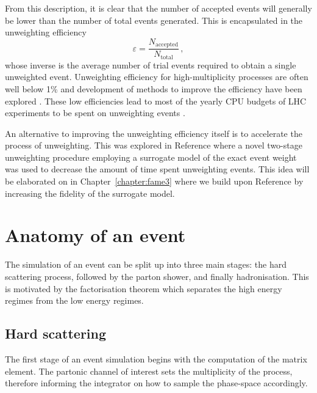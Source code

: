\documentclass[main.tex]{subfiles}
\begin{document}
    From this description, it is clear that the number
    of accepted events will generally be lower than
    the number of total events generated. This is encapsulated
    in the unweighting efficiency
    \begin{equation}\label{eqn:unweighting_efficiency}
        \varepsilon = \dfrac{N_{\mathrm{accepted}}}{N_{\mathrm{total}}} \, ,
    \end{equation}
    whose inverse is the average number of trial
    events required to obtain a single unweighted event.
    Unweighting efficiency for high-multiplicity processes
    are often well below 1\% \cite{Hoche:2019flt,Gao:2020zvv} and development
    of methods to improve the efficiency have been
    explored \cite{Jadach:1999sf,Jadach:2002kn}.
    These low efficiencies lead to most of the
    yearly CPU budgets of LHC experiments to be spent on
    unweighting events \cite{HSFPhysicsEventGeneratorWG:2020gxw}.

    An alternative to improving the unweighting efficiency
    itself is to accelerate the process of unweighting. This
    was explored in Reference \cite{Danziger:2021eeg} where a
    novel two-stage unweighting procedure employing a surrogate
    model of the exact event weight was used to decrease the amount of
    time spent unweighting events. This idea will be elaborated on
    in Chapter~\ref{chapter:fame3} where we build upon
    Reference \cite{Danziger:2021eeg} by increasing the fidelity of
    the surrogate model.

    \section{Anatomy of an event}\label{sec:anatomy_event}
    The simulation of an event can be split up into three
    main stages: the hard scattering process, followed by
    the parton shower, and finally hadronisation.
    This is motivated by the factorisation theorem
    which separates the high energy regimes from the low
    energy regimes.
    \subsection*{Hard scattering}\label{sec:me_generators}
    The first stage of an event simulation begins with
    the computation of the matrix element. The partonic
    channel of interest sets the multiplicity of the process,
    therefore informing the integrator on how to sample the phase-space
    accordingly.
\end{document}
